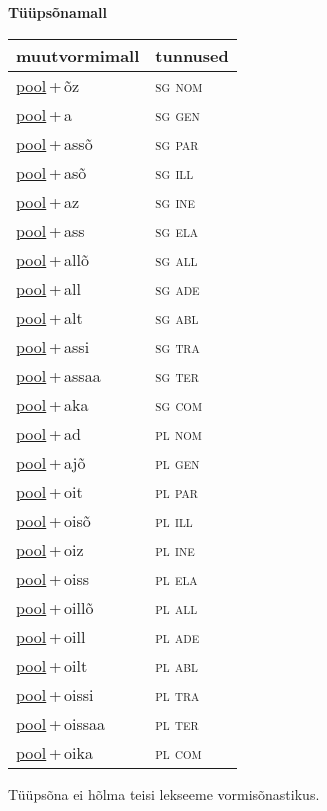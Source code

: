 
\vspace{1.8em}
\begin{minipage}{\textwidth}
\textbf{Tüüpsõnamall \,}\\

\begin{sideways}
\begin{tabular}{l l}
muutvormimall & tunnused \\
\hline
\underline{pool}\,+\,õz & \textsc{ sg nom } \\
\underline{pool}\,+\,a & \textsc{ sg gen } \\
\underline{pool}\,+\,assõ & \textsc{ sg par } \\
\underline{pool}\,+\,asõ & \textsc{ sg ill } \\
\underline{pool}\,+\,az & \textsc{ sg ine } \\
\underline{pool}\,+\,ass & \textsc{ sg ela } \\
\underline{pool}\,+\,allõ & \textsc{ sg all } \\
\underline{pool}\,+\,all & \textsc{ sg ade } \\
\underline{pool}\,+\,alt & \textsc{ sg abl } \\
\underline{pool}\,+\,assi & \textsc{ sg tra } \\
\underline{pool}\,+\,assaa & \textsc{ sg ter } \\
\underline{pool}\,+\,aka & \textsc{ sg com } \\
\underline{pool}\,+\,ad & \textsc{ pl nom } \\
\underline{pool}\,+\,ajõ & \textsc{ pl gen } \\
\underline{pool}\,+\,oit & \textsc{ pl par } \\
\underline{pool}\,+\,oisõ & \textsc{ pl ill } \\
\underline{pool}\,+\,oiz & \textsc{ pl ine } \\
\underline{pool}\,+\,oiss & \textsc{ pl ela } \\
\underline{pool}\,+\,oillõ & \textsc{ pl all } \\
\underline{pool}\,+\,oill & \textsc{ pl ade } \\
\underline{pool}\,+\,oilt & \textsc{ pl abl } \\
\underline{pool}\,+\,oissi & \textsc{ pl tra } \\
\underline{pool}\,+\,oissaa & \textsc{ pl ter } \\
\underline{pool}\,+\,oika & \textsc{ pl com } \\
\end{tabular}
\end{sideways}
\label{tab:tüüpsõnamall-poolõz}

\end{minipage}

 
\vspace{1em}
\noindent Tüüpsõna ei hõlma teisi lekseeme vormi\-sõnastikus.
